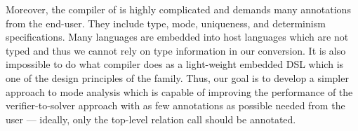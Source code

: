 Moreover, the compiler of \merc is highly complicated and demands many annotations from the end-user.
They include type, mode, uniqueness, and determinism specifications.
Many \mk languages are embedded into host languages which are not typed and thus we cannot rely on type information in our conversion.
It is also impossible to do what \merc compiler does as a light-weight embedded DSL which is one of the design principles of the \mk family.
Thus, our goal is to develop a simpler approach to mode analysis which is capable of improving the performance of the verifier-to-solver approach with as few annotations as possible needed from the user --- ideally, only the top-level relation call should be annotated.

% 


